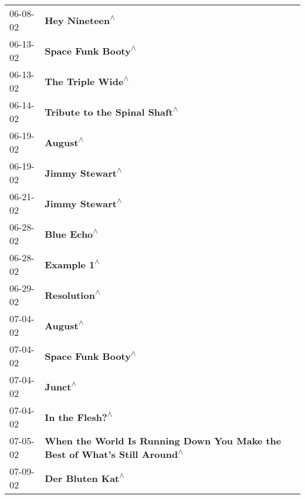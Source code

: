\begin{supertabular}{p{0.25\columnwidth}p{0.75\columnwidth}}
 06-08-02 &                                                             \textbf{Hey Nineteen\textsuperscript{$\wedge$}} \\
 06-13-02 &                                                         \textbf{Space Funk Booty\textsuperscript{$\wedge$}} \\
 06-13-02 &                                                          \textbf{The Triple Wide\textsuperscript{$\wedge$}} \\
 06-14-02 &                                              \textbf{Tribute to the Spinal Shaft\textsuperscript{$\wedge$}} \\
 06-19-02 &                                                                   \textbf{August\textsuperscript{$\wedge$}} \\
 06-19-02 &                                                            \textbf{Jimmy Stewart\textsuperscript{$\wedge$}} \\
 06-21-02 &                                                            \textbf{Jimmy Stewart\textsuperscript{$\wedge$}} \\
 06-28-02 &                                                                \textbf{Blue Echo\textsuperscript{$\wedge$}} \\
 06-28-02 &                                                                \textbf{Example 1\textsuperscript{$\wedge$}} \\
 06-29-02 &                                                               \textbf{Resolution\textsuperscript{$\wedge$}} \\
 07-04-02 &                                                                   \textbf{August\textsuperscript{$\wedge$}} \\
 07-04-02 &                                                         \textbf{Space Funk Booty\textsuperscript{$\wedge$}} \\
 07-04-02 &                                                                    \textbf{Junct\textsuperscript{$\wedge$}} \\
 07-04-02 &                                                            \textbf{In the Flesh?\textsuperscript{$\wedge$}} \\
 07-05-02 &  \textbf{When the World Is Running Down You Make the Best of What's Still Around\textsuperscript{$\wedge$}} \\
 07-09-02 &                                                           \textbf{Der Bluten Kat\textsuperscript{$\wedge$}} \\

\end{supertabular}

